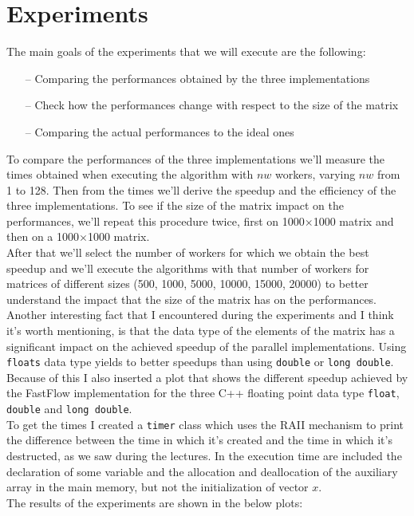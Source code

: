 \documentclass[12pt]{article}
\begin{document}
	\section{Experiments}
	The main goals of the experiments that we will execute are the following: 
	\begin{itemize}
		\item[--] Comparing the performances obtained by the three implementations 
		\item[--] Check how the performances change with respect to the size of the matrix
		\item[--] Comparing the actual performances to the ideal ones
	\end{itemize}
	To compare the performances of the three implementations we'll measure the times obtained when executing the algorithm with $nw$ workers, varying $nw$ from 1 to 128. Then from the times we'll derive the speedup and the efficiency of the three implementations. To see if the size of the matrix impact on the performances, we'll repeat this procedure twice, first on 1000$\times$1000 matrix and then on a 1000$\times$1000 matrix.\\
	After that we'll select the number of workers for which we obtain the best speedup and we'll execute the algorithms with that number of workers for matrices of different sizes (500, 1000, 5000, 10000, 15000, 20000) to better understand the impact that the size of the matrix has on the performances.\\
	Another interesting fact that I encountered during the experiments and I think it's worth mentioning, is  that the data type of the elements of the matrix has a significant impact on the achieved speedup of the parallel implementations. Using \verb|floats| data type yields to better speedups than using \verb|double| or \verb|long double|. Because of this I also inserted a plot that shows the different speedup achieved by the FastFlow implementation for the three C++ floating point data type \verb|float|, \verb|double| and \verb|long double|. \\
	To get the times I created a \verb|timer| class which uses the RAII mechanism to print the difference between the time in which it's created and the time in which it's destructed, as we saw during the lectures. In the execution time are included the declaration of some variable and the allocation and deallocation of the auxiliary array in the main memory, but not the initialization of vector $x$.\\
	The results of the experiments are shown in the below plots:
	
\end{document}
